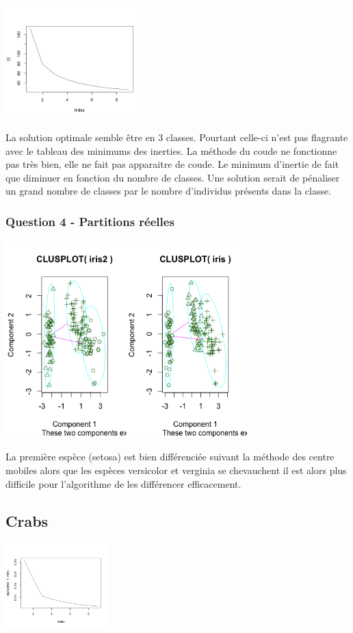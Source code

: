 \documentclass{article}\usepackage[]{graphicx}\usepackage[]{color}
\begin{document}
\includegraphics[width=0.4\textwidth]{ex2_iris_3.png}


La solution optimale semble être en 3 classes. Pourtant celle-ci n'est pas flagrante avec le tableau des minimums des inerties. La méthode du coude ne fonctionne pas très bien, elle ne fait pas apparaitre de coude. Le minimum d'inertie de  fait que diminuer en fonction du nombre de classes. 
Une solution serait de pénaliser un grand nombre de classes par le nombre d'individus présents dans la classe.

\subsubsection*{Question 4 - Partitions réelles}

\includegraphics[width=0.7\textwidth]{ex2_iris_4.png}

La première espèce (setosa) est bien différenciée suivant la méthode des centre mobiles alors que les espèces versicolor et verginia se chevauchent il est alors plus difficile pour l'algorithme de les différencer efficacement. 

\subsection*{Crabs}

\includegraphics[width=0.3\textwidth]{ex2_crab_1.png}
\end{document}
